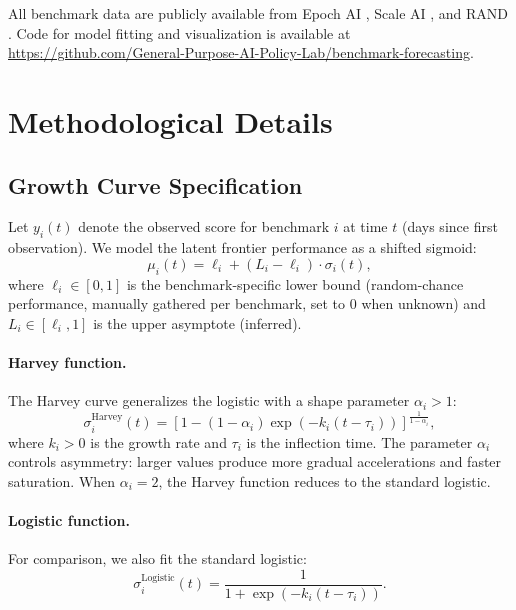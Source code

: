 \documentclass[letterpaper,twocolumn]{article}
\begin{document}
All benchmark data are publicly available from Epoch AI \citep{epoch_ai_ai_2024}, Scale AI \citep{scale_ai_introducing_2025}, and RAND \citep{dev_toward_2025}. Code for model fitting and visualization is available at \url{https://github.com/General-Purpose-AI-Policy-Lab/benchmark-forecasting}.




\appendix
\section{Methodological Details}
\label{app:methodology}

\subsection{Growth Curve Specification}

Let $y_i(t)$ denote the observed score for benchmark $i$ at time $t$ (days since first observation). We model the latent frontier performance as a shifted sigmoid:
$$\mu_i(t) = \ell_i + (L_i - \ell_i) \cdot \sigma_i(t),$$
where $\ell_i \in [0, 1]$ is the benchmark-specific lower bound (random-chance performance, manually gathered per benchmark, set to 0 when unknown) and $L_i \in [\ell_i, 1]$ is the upper asymptote (inferred).

\paragraph{Harvey function.} The Harvey curve generalizes the logistic with a shape parameter $\alpha_i > 1$:
$$\sigma_i^{\text{Harvey}}(t) = \left[1 - (1 - \alpha_i) \exp(-k_i(t - \tau_i))\right]^{\frac{1}{1-\alpha_i}},$$
where $k_i > 0$ is the growth rate and $\tau_i$ is the inflection time. The parameter $\alpha_i$ controls asymmetry: larger values produce more gradual accelerations and faster saturation. When $\alpha_i = 2$, the Harvey function reduces to the standard logistic.

\paragraph{Logistic function.} For comparison, we also fit the standard logistic:
$$\sigma_i^{\text{Logistic}}(t) = \frac{1}{1 + \exp(-k_i(t - \tau_i))}.$$
\end{document}

